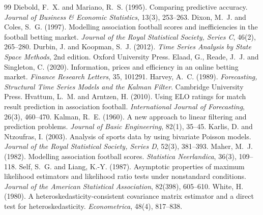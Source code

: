 \documentclass[11pt,a4paper]{article}
\begin{document}
\begin{thebibliography}{99}
 Diebold, F.~X. and Mariano, R.~S. (1995).
Comparing predictive accuracy. \emph{Journal of Business \& Economic Statistics}, 13(3), 253--263.
 Dixon, M.~J. and Coles, S.~G. (1997). Modelling
association football scores and inefficiencies in the football betting market. \emph{Journal of the
Royal Statistical Society, Series C}, 46(2), 265--280.
 Durbin, J. and Koopman, S.~J. (2012).
\emph{Time Series Analysis by State Space Methods}, 2nd edition. Oxford University Press.
 Elaad, G., Reade, J.~J. and Singleton, C. (2020). Information,
prices and efficiency in an online betting market. \emph{Finance Research Letters}, 35, 101291.
 Harvey, A.~C. (1989). \emph{Forecasting, Structural Time Series
Models and the Kalman Filter}. Cambridge University Press.
 Hvattum, L.~M. and Arntzen, H. (2010). Using ELO
ratings for match result prediction in association football. \emph{International Journal of
Forecasting}, 26(3), 460--470.
 Kalman, R.~E. (1960). A new approach to linear filtering and
prediction problems. \emph{Journal of Basic Engineering}, 82(1), 35--45.
 Karlis, D. and Ntzoufras, I. (2003). Analysis of
sports data by using bivariate Poisson models. \emph{Journal of the Royal Statistical Society, Series
D}, 52(3), 381--393.
 Maher, M.~J. (1982). Modelling association football scores.
\emph{Statistica Neerlandica}, 36(3), 109--118.
 Self, S.~G. and Liang, K.-Y. (1987). Asymptotic
properties of maximum likelihood estimators and likelihood ratio tests under nonstandard conditions.
\emph{Journal of the American Statistical Association}, 82(398), 605--610.
 White, H. (1980). A heteroskedasticity-consistent covariance matrix
estimator and a direct test for heteroskedasticity. \emph{Econometrica}, 48(4), 817--838.
\end{thebibliography}
\end{document}
